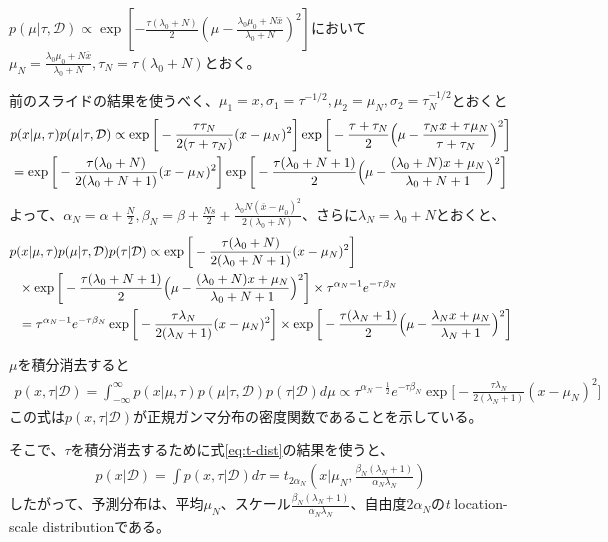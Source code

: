 \documentclass[aspectratio=169,unicode,dvipdfmx,14pt]{beamer}
\begin{document}
\begin{frame}
\FontMath
$p(\mu|\tau,\mathcal{D}) \propto \exp [ - \frac{\tau( \lambda_0 + N )}{2}  ( \mu - \frac{ \lambda_0 \mu_0 + N\bar{x} }{ \lambda_0 + N } )^2 ]$において$\mu_N = \frac{ \lambda_0 \mu_0 + N\bar{x} }{ \lambda_0 + N }, \tau_N = \tau(\lambda_0 + N)$とおく。

前のスライドの結果を使うべく、$\mu_1 = x, \sigma_1 = \tau^{-1/2}, \mu_2 = \mu_N, \sigma_2 = \tau_N^{-1/2}$とおくと
\begin{align}
& p(x|\mu,\tau) p(\mu|\tau,\mathcal{D})
\propto
\exp\bigg[ - \frac{ \tau\tau_N }{2(\tau + \tau_N)} (x - \mu_N)^2 \bigg]
\exp\bigg[ - \frac{ \tau + \tau_N }{2} \Big(\mu - \frac{ \tau_N x + \tau \mu_N }{ \tau + \tau_N }\Big)^2 \bigg]
\notag \\ & =
\exp\bigg[ - \frac{ \tau( \lambda_0 + N ) }{2(\lambda_0 + N + 1)} (x - \mu_N)^2 \bigg]
\exp\bigg[ - \frac{ \tau( \lambda_0 + N + 1 ) }{2} \Big(\mu - \frac{ ( \lambda_0 + N ) x + \mu_N }{ \lambda_0 + N + 1 }\Big)^2 \bigg]
\end{align}
よって、$\alpha_N=\alpha+\frac{N}{2}, \beta_N = \beta + \frac{Ns}{2} + \frac{ \lambda_0 N (\bar{x} - \mu_0)^2 }{ 2( \lambda_0 + N ) }$、さらに$\lambda_N = \lambda_0 + N$とおくと、
\begin{align}
& p(x|\mu,\tau) p(\mu|\tau,\mathcal{D})p(\tau|\mathcal{D})
\propto
\exp\bigg[ - \frac{ \tau( \lambda_0 + N ) }{2(\lambda_0 + N + 1)} (x - \mu_N)^2 \bigg]
\notag \\ & \mbox{ \ } \times
\exp\bigg[ - \frac{ \tau( \lambda_0 + N + 1 ) }{2} \Big(\mu - \frac{ ( \lambda_0 + N ) x + \mu_N }{ \lambda_0 + N + 1 }\Big)^2 \bigg] \times
\tau^{\alpha_N - 1} e^{ - \tau \beta_N }
\notag \\ & \mbox{ \ } = \tau^{\alpha_N - 1} e^{ - \tau \beta_N }
\exp\bigg[ - \frac{ \tau \lambda_N }{2(\lambda_N + 1)} (x - \mu_N)^2 \bigg]
\times \exp\bigg[ - \frac{ \tau( \lambda_N + 1 ) }{2} \Big(\mu - \frac{ \lambda_N x + \mu_N }{ \lambda_N + 1 }\Big)^2 \bigg]
\end{align}
\end{frame}

\begin{frame}
\FontMath
$\mu$を積分消去すると
\begin{align}
p(x, \tau|\mathcal{D})
= \int_{-\infty}^\infty p(x|\mu,\tau) p(\mu|\tau,\mathcal{D})p(\tau|\mathcal{D}) d\mu
\propto
\tau^{\alpha_N - \frac{1}{2}}
e^{ - \tau \beta_N } \exp\bigg[ - \frac{ \tau \lambda_N }{2(\lambda_N + 1)} (x - \mu_N)^2 \bigg]
\end{align}
この式は$p(x, \tau|\mathcal{D})$が正規ガンマ分布の密度関数であることを示している。

そこで、$\tau$を積分消去するために式\eqref{eq:t-dist}の結果を使うと、
\begin{align}
p(x|\mathcal{D}) = \int p(x, \tau|\mathcal{D}) d\tau
= t_{2\alpha_N} ( x | \mu_N, \frac{\beta_N(\lambda_N + 1)}{\alpha_N\lambda_N} ) 
\end{align}
したがって、予測分布は、平均$\mu_N$、スケール$\frac{\beta_N(\lambda_N + 1)}{\alpha_N\lambda_N}$、自由度$2\alpha_N$の\textit{t} location-scale distributionである。
\end{frame}
\end{document}
